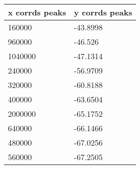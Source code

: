 \begin{tabular}{ll}
x corrds peaks & y corrds peaks \\ 
\hline 
160000 & -43.8998 \\ 
960000 & -46.526 \\ 
1040000 & -47.1314 \\ 
240000 & -56.9709 \\ 
320000 & -60.8188 \\ 
400000 & -63.6504 \\ 
2000000 & -65.1752 \\ 
640000 & -66.1466 \\ 
480000 & -67.0256 \\ 
560000 & -67.2505 \\ 
\hline 
\end{tabular}